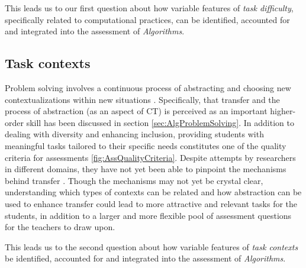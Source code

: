 This leads us to our first question about how variable features of \emph{task difficulty}, specifically related to computational practices, can be identified, accounted for and integrated into the assessment of \emph{Algorithms}.



\subsection*{Task contexts}
Problem solving involves a continuous process of abstracting and choosing new contextualizations within new situations \cite{oers2004recontextualization}. Specifically, that transfer and the process of abstraction (as an aspect of CT) is perceived as an important higher-order skill has been discussed in section \ref{sec:AlgProblemSolving}. In addition to dealing with diversity and enhancing inclusion, providing students with meaningful tasks tailored to their specific needs constitutes one of the quality criteria for assessments \ref{fig:AssQualityCriteria}. Despite attempts by researchers in different domains, they have not yet been able to pinpoint the mechanisms behind transfer \cite{oers2004recontextualization}. Though the mechanisms may not yet be crystal clear, understanding which types of contexts can be related and how abstraction can be used to enhance transfer could lead to more attractive and relevant tasks for the students, in addition to a larger and more flexible pool of assessment questions for the teachers to draw upon.

This leads us to the second question about how variable features of \emph{task contexts} be identified, accounted for and integrated into the assessment of \emph{Algorithms}.



